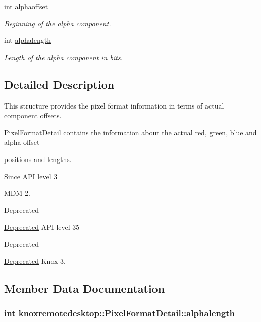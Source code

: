 \begin{DoxyCompactItemize}
int \hyperlink{structknoxremotedesktop_1_1PixelFormatDetail_a4cfaeee3077ff3609b0d7a5aab4e5a83}{alphaoffset}
\begin{DoxyCompactList}\small\item\em \-Beginning of the alpha component. \end{DoxyCompactList}\item 
int \hyperlink{structknoxremotedesktop_1_1PixelFormatDetail_a2e62bca1625dfeefebd537dd0678627d}{alphalength}
\begin{DoxyCompactList}\small\item\em \-Length of the alpha component in bits. \end{DoxyCompactList}\end{DoxyCompactItemize}


\subsection{\-Detailed \-Description}
\-This structure provides the pixel format information in terms of actual component offsets. 

\hyperlink{structknoxremotedesktop_1_1PixelFormatDetail}{\-Pixel\-Format\-Detail} contains the information about the actual red, green, blue and alpha offset

positions and lengths.

\begin{DoxySince}{\-Since}
\-A\-P\-I level 3

\-M\-D\-M 2.
\end{DoxySince}
\begin{DoxyRefDesc}{\-Deprecated}
\item[\hyperlink{deprecated__deprecated000007}{\-Deprecated}]\-A\-P\-I level 35\end{DoxyRefDesc}


\begin{DoxyRefDesc}{\-Deprecated}
\item[\hyperlink{deprecated__deprecated000008}{\-Deprecated}]\-Knox 3.\end{DoxyRefDesc}


\subsection{\-Member \-Data \-Documentation}
\hypertarget{structknoxremotedesktop_1_1PixelFormatDetail_a2e62bca1625dfeefebd537dd0678627d}{
\subsubsection[{alphalength}]{\setlength{\rightskip}{0pt plus 5cm}int {\bf knoxremotedesktop\-::\-Pixel\-Format\-Detail\-::alphalength}}}\label{structknoxremotedesktop_1_1PixelFormatDetail_a2e62bca1625dfeefebd537dd0678627d}


